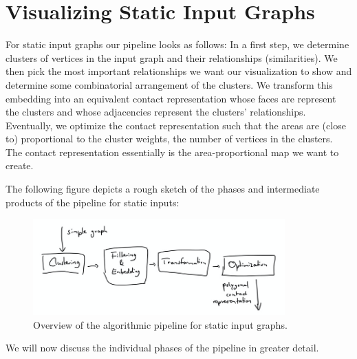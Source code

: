 \chapter{Visualizing Static Input Graphs}
\label{chap:visualizing-static-input-graphs}

For static input graphs our pipeline looks as follows: In a first step, we determine clusters of vertices in the input graph and their relationships (similarities). We then pick the most important relationships we want our visualization to show and determine some combinatorial arrangement of the clusters. We transform this embedding into an equivalent contact representation whose faces are represent the clusters and whose adjacencies represent the clusters' relationships. Eventually, we optimize the contact representation such that the areas are (close to) proportional to the cluster weights, \ie{} the number of vertices in the clusters. The contact representation essentially is the area-proportional map we want to create.

The following figure depicts a rough sketch of the phases and intermediate products of the pipeline for static inputs:

\begin{figure}[H]
	\centering\includegraphics[height=140px]{Resources/Pipeline-Static.png}
	\caption{Overview of the algorithmic pipeline for static input graphs.}
	\label{fig:pipeline-static}
\end{figure}

We will now discuss the individual phases of the pipeline in greater detail.

\clearpage

\clearpage

\clearpage

\clearpage

